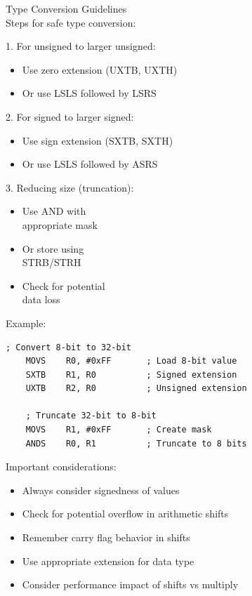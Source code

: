\begin{KR}{Type Conversion Guidelines}\\
Steps for safe type conversion:

\begin{minipage}[t]{0.58\textwidth}
1. For unsigned to larger unsigned:
\begin{itemize}
  \item Use zero extension (UXTB, UXTH)
  \item Or use LSLS followed by LSRS
\end{itemize}

2. For signed to larger signed:
\begin{itemize}
  \item Use sign extension (SXTB, SXTH)
  \item Or use LSLS followed by ASRS
\end{itemize}
\end{minipage}
\begin{minipage}[t]{0.4\textwidth}
3. Reducing size (truncation):
\begin{itemize}
  \item Use AND with \\appropriate mask
  \item Or store using\\ STRB/STRH
  \item Check for potential\\ data loss
\end{itemize}
\end{minipage}

Example:
\begin{lstlisting}[language=armasm, style=basesmol]
    ; Convert 8-bit to 32-bit
    MOVS    R0, #0xFF       ; Load 8-bit value
    SXTB    R1, R0          ; Signed extension
    UXTB    R2, R0          ; Unsigned extension
    
    ; Truncate 32-bit to 8-bit
    MOVS    R1, #0xFF       ; Create mask
    ANDS    R0, R1          ; Truncate to 8 bits
\end{lstlisting}
\end{KR}

\begin{remark}
Important considerations:
\begin{itemize}
  \item Always consider signedness of values
  \item Check for potential overflow in arithmetic shifts
  \item Remember carry flag behavior in shifts
  \item Use appropriate extension for data type
  \item Consider performance impact of shifts vs multiply
\end{itemize}
\end{remark}

